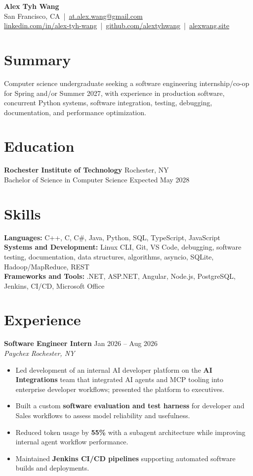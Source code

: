 \documentclass[10pt,letterpaper]{article}
\newif\ifresumeFirstRole
\newcommand{\resumeRole}[4]{%
  \ifresumeFirstRole
    \global\resumeFirstRolefalse
  \else
    \vspace{0pt plus 1fill}%
  \fi
  \textbf{#1} \hfill #2\\
  \textit{#3} \hfill \textit{#4}
}
\begin{document}
\begin{center}
{\Large \textbf{Alex Tyh Wang}}\\
San Francisco, CA \,|\, \href{mailto:at.alex.wang@gmail.com}{at.alex.wang@gmail.com}\\
\small \href{https://www.linkedin.com/in/alex-tyh-wang/}{linkedin.com/in/alex-tyh-wang} \,|\, \href{https://github.com/alextyhwang}{github.com/alextyhwang} \,|\, \href{https://alexwang.site}{alexwang.site}
\end{center}

\section*{Summary}
Computer science undergraduate seeking a software engineering internship/co-op for Spring and/or Summer 2027, with experience in production software, concurrent Python systems, software integration, testing, debugging, documentation, and performance optimization.

\section*{Education}
\textbf{Rochester Institute of Technology} \hfill Rochester, NY\\
Bachelor of Science in Computer Science \hfill Expected May 2028

\section*{Skills}
\textbf{Languages:} C++, C, C\#, Java, Python, SQL, TypeScript, JavaScript\\
\textbf{Systems and Development:} Linux CLI, Git, VS Code, debugging, software testing, documentation, data structures, algorithms, asyncio, SQLite, Hadoop/MapReduce, REST\\
\textbf{Frameworks and Tools:} .NET, ASP.NET, Angular, Node.js, PostgreSQL, Jenkins, CI/CD, Microsoft Office

\section*{Experience}
\resumeRole{Software Engineer Intern}{Jan 2026 -- Aug 2026}{Paychex}{Rochester, NY}
\begin{itemize}
  \item Led development of an internal AI developer platform on the \textbf{AI Integrations} team that integrated AI agents and MCP tooling into enterprise developer workflows; presented the platform to executives.
  \item Built a custom \textbf{software evaluation and test harness} for developer and Sales workflows to assess model reliability and usefulness.
  \item Reduced token usage by \textbf{55\%} with a subagent architecture while improving internal agent workflow performance.
  \item Maintained \textbf{Jenkins CI/CD pipelines} supporting automated software builds and deployments.
\end{itemize}
\end{document}
